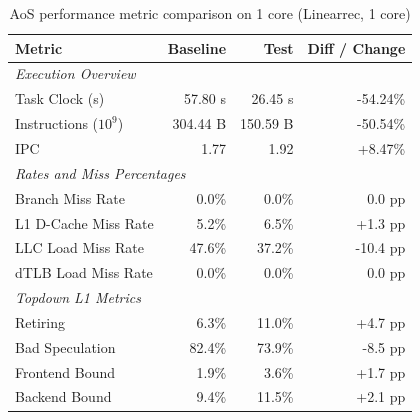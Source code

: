\begin{table}[htbp]
  \centering
  \caption{AoS performance metric comparison on 1 core (Linearrec, 1 core)}
  \label{tab:perf_comparison_aos_linearrec_1core}
  \begin{tabular}{lrrr}
    \toprule
    \textbf{Metric} & \textbf{Baseline} & \textbf{Test} & \textbf{Diff / Change} \\
    \midrule
    \multicolumn{4}{l}{\textit{Execution Overview}} \\
    \quad Task Clock (s)           & 57.80 s   & 26.45 s   & -54.24\%   \\
    \quad Instructions ($10^9$)    & 304.44 B  & 150.59 B  & -50.54\%   \\
    \quad IPC                      & 1.77       & 1.92       & +8.47\%    \\
    \midrule
    \multicolumn{4}{l}{\textit{Rates and Miss Percentages}} \\
    \quad Branch Miss Rate         & 0.0\%      & 0.0\%      & 0.0 pp     \\
    \quad L1 D-Cache Miss Rate     & 5.2\%      & 6.5\%      & +1.3 pp    \\
    \quad LLC Load Miss Rate       & 47.6\%     & 37.2\%     & -10.4 pp    \\
    \quad dTLB Load Miss Rate      & 0.0\%      & 0.0\%      & 0.0 pp     \\
    \midrule
    \multicolumn{4}{l}{\textit{Topdown L1 Metrics}} \\
    \quad Retiring                 & 6.3\%      & 11.0\%      & +4.7 pp    \\
    \quad Bad Speculation          & 82.4\%     & 73.9\%     & -8.5 pp   \\
    \quad Frontend Bound           & 1.9\%      & 3.6\%      & +1.7 pp    \\
    \quad Backend Bound            & 9.4\%      & 11.5\%      & +2.1 pp    \\
    \bottomrule
  \end{tabular}
\end{table}


